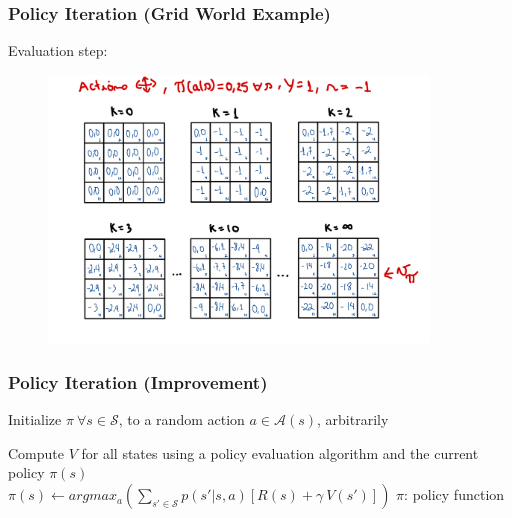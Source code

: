 \begin{frame}
    \frametitle{Policy Iteration (Grid World Example)}
    Evaluation step:
    \begin{figure}
        \centering
        \includegraphics[width=0.9\textwidth]{sections/optimization/figures/grid_world_pi_4.pdf}
    \end{figure}
\end{frame}

\begin{frame}
    \frametitle{Policy Iteration (Improvement)}
        \begin{algorithmic}[1]
            \STATE Initialize $\pi~\forall s \in \mathcal{S}$, to a random action $a \in \mathcal{A}(s)$, arbitrarily
            \break
            
            \REPEAT{}
                \STATE Compute $V$ for all states using a policy evaluation algorithm and the current policy $\pi(s)$\\
                
                    \STATE$\pi(s)\leftarrow argmax_{a}(\sum_{s'\in\mathcal{S}}p(s'|s,a)[R(s)+\gamma~V(s')])$
                \ENDFOR{}
            \break
            \RETURN $\pi$: policy function

        \end{algorithmic}

\end{frame} 





